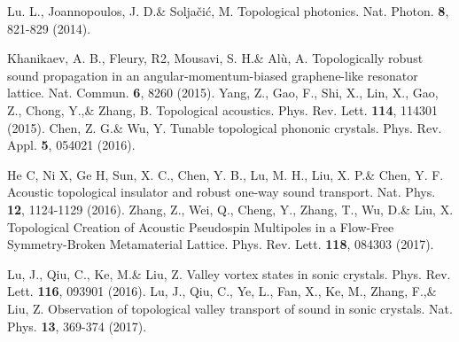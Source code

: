 \documentclass[aps,preprint,onecolumn,showpacs,superscriptaddress,groupedaddress]{revtex4}  %
\begin{document}
\begin{thebibliography}{99}
	Lu. L., Joannopoulos, J. D.\& Soljačić, M. Topological photonics. Nat. Photon. \textbf{8}, 821-829 (2014).

	Khanikaev, A. B., Fleury, R2, Mousavi, S. H.\& Alù, A. Topologically robust sound propagation in an angular-momentum-biased graphene-like resonator lattice. Nat. Commun. \textbf{6}, 8260 (2015).
	Yang, Z., Gao, F., Shi, X., Lin, X., Gao, Z., Chong, Y.,\& Zhang, B. Topological acoustics. Phys. Rev. Lett. \textbf{114}, 114301 (2015).
	Chen, Z. G.\& Wu, Y. Tunable topological phononic crystals. Phys. Rev. Appl. \textbf{5}, 054021 (2016). 

	He C, Ni X, Ge H, Sun, X. C., Chen, Y. B., Lu, M. H., Liu, X. P.\& Chen, Y. F.  Acoustic topological insulator and robust one-way sound transport. Nat. Phys. \textbf{12}, 1124-1129 (2016).
	Zhang, Z., Wei, Q., Cheng, Y., Zhang, T., Wu, D.\& Liu, X. Topological Creation of Acoustic Pseudospin Multipoles in a Flow-Free Symmetry-Broken Metamaterial Lattice. Phys. Rev. Lett.  \textbf{118}, 084303 (2017).

	Lu, J., Qiu, C., Ke, M.\& Liu, Z. Valley vortex states in sonic crystals. Phys. Rev. Lett. \textbf{116}, 093901 (2016).
	Lu, J., Qiu, C., Ye, L., Fan, X., Ke, M., Zhang, F.,\& Liu, Z. Observation of topological valley transport of sound in sonic crystals. Nat. Phys. \textbf{13}, 369-374 (2017).



\end{thebibliography}
\end{document}
